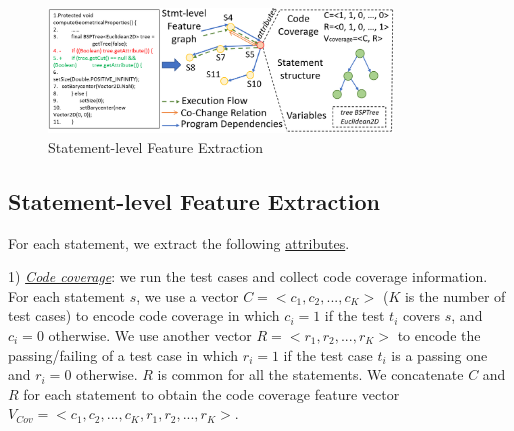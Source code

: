 

\begin{figure}[t]
	\centering
	\includegraphics[width=3.6in]{graphs/step-1-statement.png}
        \vspace{-19pt}
	\caption{Statement-level Feature Extraction}
        \vspace{-5pt}
	\label{statement-level-feature-extraction}
\end{figure}

\subsection{Statement-level Feature Extraction}

For each statement, we extract the following \underline{attributes}.

1) {\em \underline{Code coverage}}: we run the test cases and collect
code coverage information. For each statement $s$, we use a vector $C
= <c_1, c_2, ..., c_K>$ ($K$ is the number of test cases) to encode
code coverage in which $c_i=1$ if the test $t_i$ covers $s$, and
$c_i=0$ otherwise. We use another vector $R = <r_1, r_2, ..., r_K>$ to
encode the passing/failing of a test case in which $r_i=1$ if the test
case $t_i$ is a passing one and $r_i=0$ otherwise. $R$ is common for
all the statements. We concatenate $C$ and $R$ for each statement to
obtain the code coverage feature vector $V_{Cov} = <c_1, c_2, ...,
c_K, r_1, r_2, ..., r_K>$.

